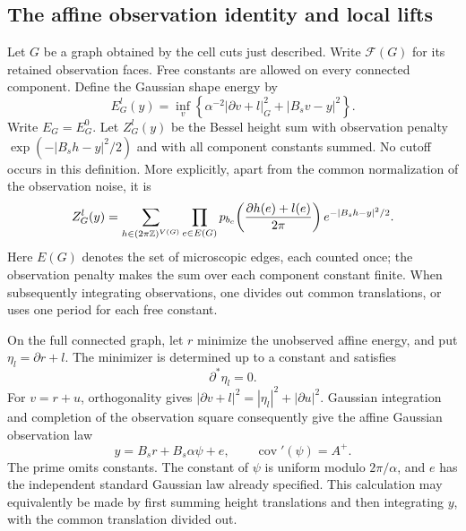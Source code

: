 \subsection{The affine observation identity and local lifts}
\label{prep:gaussian-identity}

Let $G$ be a graph obtained by the cell cuts just described.  Write
$\mathcal F(G)$ for its retained observation faces.  Free constants are
allowed on every connected component.  Define the Gaussian shape energy
by
\begin{equation}\label{eq:shape-energy}
 E_G^l(y)=\inf_v\left\{\alpha^{-2}|\partial v+l|_G^2
                                      +|B_sv-y|^2\right\}.
\end{equation}
Write $E_G=E_G^0$.  Let $Z_G^l(y)$ be the Bessel height sum with observation
penalty $\exp(-|B_sh-y|^2/2)$ and with all component constants summed.
No cutoff occurs in this definition.  More explicitly, apart from the
common normalization of the observation noise, it is
\[
 Z_G^l(y)=\sum_{h\in(2\pi\mathbb Z)^{V(G)}}
       \prod_{e\in E(G)}p_{b_c}\!\left(\frac{\partial h(e)+l(e)}{2\pi}\right)
                         e^{-|B_sh-y|^2/2}.
\]
Here $E(G)$ denotes the set of microscopic edges, each counted once;
the observation penalty makes the sum over each component constant
finite.  When subsequently integrating observations, one divides out
common translations, or uses one period for each free constant.

On the full connected graph, let $r$ minimize the unobserved affine
energy, and put $\eta_l=\partial r+l$.  The minimizer is determined up to
a constant and satisfies
\[
                         \partial^*\eta_l=0.
\]
For $v=r+u$, orthogonality gives
$|\partial v+l|^2=|\eta_l|^2+|\partial u|^2$.  Gaussian integration and
completion of the observation square consequently give the affine
Gaussian observation law
\begin{equation}\label{eq:gaussian-observation}
 y=B_sr+B_s\alpha\psi+e,
 \qquad \operatorname{cov}'(\psi)=A^+.
\end{equation}
The prime omits constants.  The constant of $\psi$ is uniform modulo
$2\pi/\alpha$, and $e$ has the independent standard Gaussian law already
specified.  This calculation may equivalently be made by first summing
height translations and then integrating $y$, with the common translation
divided out.

